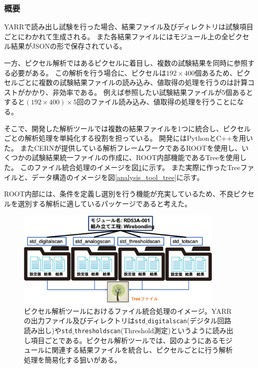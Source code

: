 \subsubsection{概要}
YARRで読み出し試験を行った場合、結果ファイル及びディレクトリは試験項目ごとにわかれて生成される。
また各結果ファイルにはモジュール上の全ピクセル結果がJSONの形で保存されている。

一方、ピクセル解析ではあるピクセルに着目し、複数の試験結果を同時に参照する必要がある。
この解析を行う場合に、ピクセルは$192\times 400$個あるため、ピクセルごとに複数の試験結果ファイルの読み込み、値取得の処理を行うのは計算コストがかかり、非効率である。
例えば参照したい試験結果ファイルが5個あるとすると$(192\times 400)\times 5$回のファイル読み込み、値取得の処理を行うことになる。

そこで、開発した解析ツールでは複数の結果ファイルを1つに統合し、ピクセルごとの解析処理を単純化する役割を担っている。
開発にはPythonとC++を用いた。
またCERNが提供している解析フレームワークであるROOT\cite{4-5}を使用し、いくつかの試験結果統一ファイルの作成に、ROOT内部機能であるTreeを使用した。
このファイル統合処理のイメージを図\ref{analysis_tool_motivation}に示す。
また実際に作ったTreeファイルと、データ構造のイメージを図\ref{analysis_tool_tree}に示す。

ROOT内部には、条件を定義し選別を行う機能が充実しているため、不良ピクセルを選別する解析に適しているパッケージであると考えた。

\begin{figure}[bpt]\centering
\includegraphics[width=10cm]{./analysis_tool_motivation.png}
\caption[ピクセル解析ツールにおけるファイル統合処理のイメージ]{ピクセル解析ツールにおけるファイル統合処理のイメージ。YARRの出力ファイル及びディレクトリは\texttt{std$\_$digitalscan}(デジタル回路読み出し)や\texttt{std$\_$thresholdscan}(Threshold測定)というように読み出し項目ごとである。ピクセル解析ツールでは、図のようにあるモジュールに関連する結果ファイルを統合し、ピクセルごとに行う解析処理を簡易化する狙いがある。}
\label{analysis_tool_motivation}
\end{figure}


